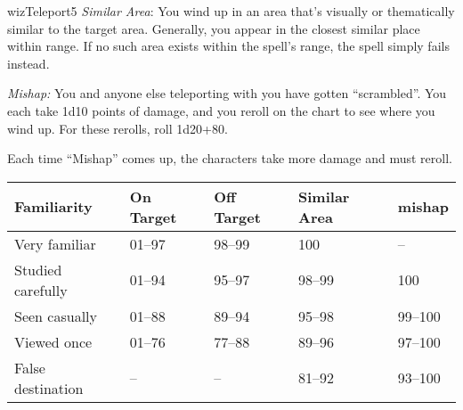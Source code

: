 \begin{spellcard}{wiz}{Teleport}{5}
  \emph{Similar Area}: You wind up in an area that's visually or
  thematically similar to the target area. Generally, you appear in the
  closest similar place within range. If no such area exists within the
  spell's range, the spell simply fails instead.

  \emph{Mishap:} You and anyone else teleporting with you have gotten
  ``scrambled''. You each take 1d10 points of damage, and you reroll on the
  chart to see where you wind up. For these rerolls, roll 1d20+80.

  Each time ``Mishap'' comes up, the characters take more damage and must
  reroll.

  \begin{longtable}[]{@{}lllll@{}}
    \toprule
    Familiarity       & On Target & Off Target & Similar Area & mishap \tabularnewline\midrule
    \endhead{}
    Very familiar     & 01--97    & 98--99     & 100          & --\tabularnewline{}
    Studied carefully & 01--94    & 95--97     & 98--99       & 100\tabularnewline{}
    Seen casually     & 01--88    & 89--94     & 95--98       & 99--100\tabularnewline{}
    Viewed once       & 01--76    & 77--88     & 89--96       & 97--100\tabularnewline{}
    False destination & --        & --         & 81--92       & 93--100\tabularnewline\bottomrule
  \end{longtable}

\end{spellcard}

